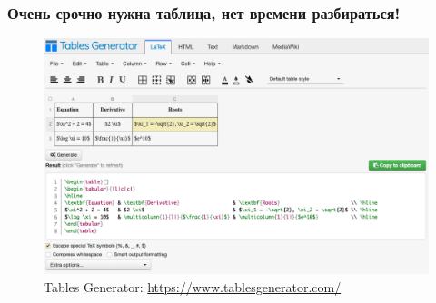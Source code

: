 \begin{frame}

\frametitle{Очень срочно нужна таблица, нет времени разбираться!}

\begin{figure}
    \centering
    \includegraphics[scale=0.25]{images/tables.png}
    \\
        Tables Generator: {\color{blue} \url{https://www.tablesgenerator.com/}}
\end{figure}

\end{frame}
